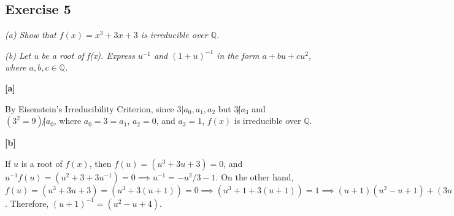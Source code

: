 \subsection*{Exercise 5}
\textit{(a) Show that $f(x) = x^3 + 3x + 3$ is irreducible over $\mathbb{Q}$.}

\textit{(b) Let u be a root of f(x). Express $u^{-1}$ and $(1+u)^{-1}$ in the form $a + bu + cu^2$, where $a,b,c \in \mathbb{Q}$.}

\vspace{5 mm}
\textbf{[a]}

By Eisenstein's Irreducibility Criterion, since $3 | a_0,a_1,a_2$ but $3 \not| a_3$ and $(3^2 = 9) \not| a_0$, where $a_0 = 3 = a_1$, $a_2 = 0$, and $a_3 = 1$, $f(x)$ is irreducible over $\mathbb{Q}$. 
\vspace{5 mm}

\textbf{[b]}

If $u$ is a root of $f(x)$, then $f(u) = (u^3 + 3u + 3) = 0$, and $u^{-1}f(u) = (u^2 + 3 + 3u^{-1}) = 0 \implies u^{-1} = -u^2/3 - 1$. On the other hand, $f(u) = (u^3 + 3u + 3) = (u^3 + 3(u + 1)) = 0 \implies (u^3 + 1 + 3(u + 1)) = 1 \implies (u+1)(u^2-u+1)+(3u+1) = (u+1)(u^2-u+4)=1$. Therefore, $(u+1)^{-1} = (u^2-u+4)$.